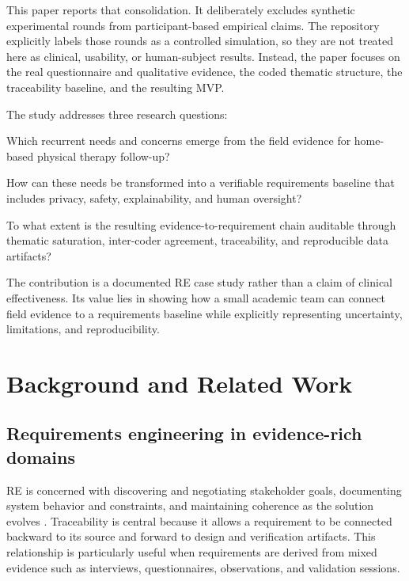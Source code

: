 \documentclass[pdflatex,sn-basic]{sn-jnl}
\begin{document}
This paper reports that consolidation. It deliberately excludes synthetic experimental rounds from participant-based empirical claims. The repository explicitly labels those rounds as a controlled simulation, so they are not treated here as clinical, usability, or human-subject results. Instead, the paper focuses on the real questionnaire and qualitative evidence, the coded thematic structure, the traceability baseline, and the resulting MVP.

The study addresses three research questions:

\begin{description}[leftmargin=1.3cm,labelwidth=1.0cm]
\item[RQ1.] Which recurrent needs and concerns emerge from the field evidence for home-based physical therapy follow-up?
\item[RQ2.] How can these needs be transformed into a verifiable requirements baseline that includes privacy, safety, explainability, and human oversight?
\item[RQ3.] To what extent is the resulting evidence-to-requirement chain auditable through thematic saturation, inter-coder agreement, traceability, and reproducible data artifacts?
\end{description}

The contribution is a documented RE case study rather than a claim of clinical effectiveness. Its value lies in showing how a small academic team can connect field evidence to a requirements baseline while explicitly representing uncertainty, limitations, and reproducibility.

\section{Background and Related Work}
\subsection{Requirements engineering in evidence-rich domains}
RE is concerned with discovering and negotiating stakeholder goals, documenting system behavior and constraints, and maintaining coherence as the solution evolves \citep{pohl2010requirements,iso29148_2018}. Traceability is central because it allows a requirement to be connected backward to its source and forward to design and verification artifacts. This relationship is particularly useful when requirements are derived from mixed evidence such as interviews, questionnaires, observations, and validation sessions.
\end{document}
